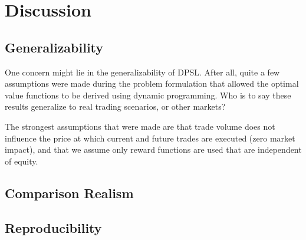 \section{Discussion}

\subsection{Generalizability}
One concern might lie in the generalizability of DPSL. After all, quite a few assumptions were made during the problem formulation that allowed the optimal value functions to be derived using dynamic programming. Who is to say these results generalize to real trading scenarios, or other markets?

The strongest assumptions that were made are that trade volume does not influence the price at which current and future trades are executed (zero market impact), and that we assume only reward functions are used that are independent of equity. 

\subsection{Comparison Realism}



\subsection{Reproducibility}


